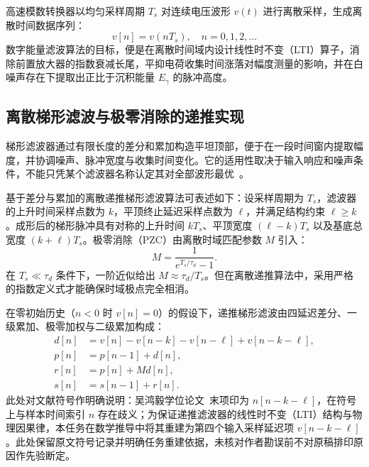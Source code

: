 高速模数转换器以均匀采样周期 $T_s$ 对连续电压波形 $v(t)$ 进行离散采样，生成离散时间数据序列：
\begin{equation}\label{eq:5-3-vn}
v[n] = v(n T_s), \quad n = 0, 1, 2, \dots
\end{equation}
数字能量滤波算法的目标，便是在离散时间域内设计线性时不变（LTI）算子，消除前置放大器的指数衰减长尾，平抑电荷收集时间涨落对幅度测量的影响，并在白噪声存在下提取出正比于沉积能量 $E_\gamma$ 的脉冲高度。

\subsection{离散梯形滤波与极零消除的递推实现}\label{subsec:5-3-2}

梯形滤波器通过有限长度的差分和累加构造平坦顶部，便于在一段时间窗内提取幅度，并协调噪声、脉冲宽度与收集时间变化。它的适用性取决于输入响应和噪声条件，不能只凭某个滤波器名称认定其对全部波形最优~\cite{wu-hongyi-2020-general-purpose-digital-daq-thesis, wu-2021-general-purpose-digital-daq-waveform-analysis}。

基于差分与累加的离散递推梯形滤波算法可表述如下：设采样周期为 $T_s$，滤波器的上升时间采样点数为 $k$，平顶终止延迟采样点数为 $\ell$，并满足结构约束 $\ell \ge k$。成形后的梯形脉冲具有对称的上升时间 $k T_s$、平顶宽度 $(\ell - k) T_s$ 以及基底总宽度 $(k + \ell) T_s$。极零消除（PZC）由离散时域匹配参数 $M$ 引入：
\begin{equation}\label{eq:5-3-m-pzc}
M = \frac{1}{e^{T_s / \tau_d} - 1}.
\end{equation}
在 $T_s \ll \tau_d$ 条件下，一阶近似给出 $M \approx \tau_d / T_s$。但在离散递推算法中，采用严格的指数定义式才能确保时域极点完全相消。

在零初始历史（$n < 0$ 时 $v[n] = 0$）的假设下，递推梯形滤波由四延迟差分、一级累加、极零加权与二级累加构成：
\begin{align}
d[n] &= v[n] - v[n-k] - v[n-\ell] + v[n-k-\ell], \label{eq:5-3-dn} \\
p[n] &= p[n-1] + d[n], \label{eq:5-3-pn} \\
r[n] &= p[n] + M d[n], \label{eq:5-3-rn} \\
s[n] &= s[n-1] + r[n]. \label{eq:5-3-sn}
\end{align}
此处对文献符号作明确说明：吴鸿毅学位论文~\cite[第~20~页，式~(1.14)、(1.19)]{wu-hongyi-2020-general-purpose-digital-daq-thesis}末项印为 $n[n-k-\ell]$，在符号上与样本时间索引 $n$ 存在歧义；为保证递推滤波器的线性时不变（LTI）结构与物理因果律，本任务在数学推导中将其重建为第四个输入采样延迟项 $v[n-k-\ell]$。此处保留原文符号记录并明确任务重建依据，未核对作者勘误前不对原稿排印原因作先验断定。

